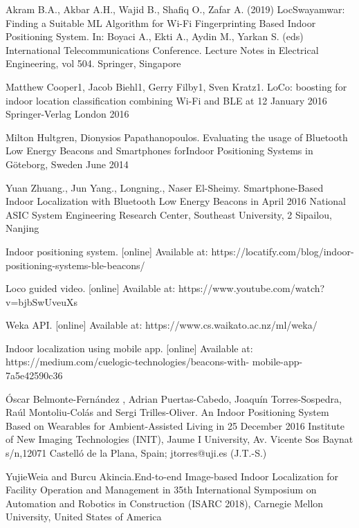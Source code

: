 \documentclass{article}
\begin{document}


\begin{thebibliography}{9}
Akram B.A., Akbar A.H., Wajid B., Shafiq O., Zafar A. (2019) LocSwayamwar: Finding a Suitable ML Algorithm for Wi-Fi Fingerprinting Based Indoor Positioning System. In: Boyaci A., Ekti A., Aydin M., Yarkan S. (eds) 
International Telecommunications Conference. Lecture Notes in Electrical Engineering, vol 504. Springer, Singapore

Matthew Cooper1, Jacob Biehl1, Gerry Filby1, Sven Kratz1. LoCo: boosting for indoor location classification combining Wi-Fi and BLE at 12 January 2016 Springer-Verlag London 2016

Milton Hultgren, Dionysios Papathanopoulos. Evaluating the usage of Bluetooth Low Energy Beacons and Smartphones forIndoor Positioning Systems in Göteborg, Sweden June 2014


Yuan Zhuang., Jun Yang., Longning., Naser El-Sheimy. Smartphone-Based Indoor Localization with
Bluetooth Low Energy Beacons in April 2016 National ASIC System Engineering Research Center, Southeast University, 2 Sipailou, Nanjing


Indoor positioning system. [online] Available at: https://locatify.com/blog/indoor-positioning-systems-ble-beacons/

Loco guided video. [online] Available at: https://www.youtube.com/watch?v=bjbSwUveuXs


Weka API. [online] Available at: https://www.cs.waikato.ac.nz/ml/weka/



 Indoor localization using mobile app. 
[online] Available at: https://medium.com/cuelogic-technologies/beacons-with-
mobile-app-7a5e42590c36

Óscar Belmonte-Fernández , Adrian Puertas-Cabedo, Joaquín Torres-Sospedra,
Raúl Montoliu-Colás and Sergi Trilles-Oliver. An Indoor Positioning System Based on Wearables
for Ambient-Assisted Living in 25 December 2016 Institute of New Imaging Technologies (INIT), Jaume I University, Av. Vicente Sos Baynat s/n,12071 Castelló de la Plana, Spain; jtorres@uji.es (J.T.-S.)

YujieWeia and Burcu Akincia.End-to-end Image-based Indoor Localization for Facility
Operation and Management in 35th International Symposium on Automation and Robotics in Construction (ISARC 2018), Carnegie Mellon University, United States of America


\end{thebibliography}
\end{document}

